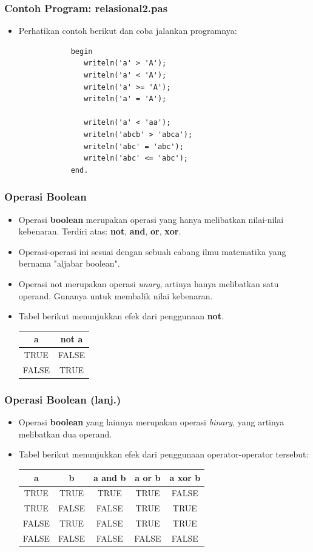\documentclass{beamer}
\begin{document}
\begin{frame}[fragile]
\frametitle{Contoh Program: relasional2.pas}
\begin{itemize}
    \item Perhatikan contoh berikut dan coba jalankan programnya:
        \begin{lstlisting}
            begin
               writeln('a' > 'A');
               writeln('a' < 'A');
               writeln('a' >= 'A');
               writeln('a' = 'A');

               writeln('a' < 'aa');
               writeln('abcb' > 'abca');
               writeln('abc' = 'abc');
               writeln('abc' <= 'abc');
            end.
        \end{lstlisting}
\end{itemize}
\end{frame}

\begin{frame}
\frametitle{Operasi Boolean}
\begin{itemize}
    \item Operasi \textbf{boolean} merupakan operasi yang hanya melibatkan nilai-nilai kebenaran. Terdiri atas: \textbf{not}, \textbf{and}, \textbf{or}, \textbf{xor}.
    \item Operasi-operasi ini sesuai dengan sebuah cabang ilmu matematika yang bernama "aljabar boolean".
    \item Operasi \alert{not} merupakan operasi \textit{unary}, artinya hanya melibatkan satu operand. Gunanya untuk membalik nilai kebenaran.
    \item Tabel berikut menunjukkan efek dari penggunaan \textbf{not}.
    \begin{tabular}{|c|c|}
    \hline a & not a \\
    \hline TRUE & FALSE \\
    \hline FALSE & TRUE \\
    \hline
    \end{tabular}
\end{itemize}
\end{frame}

\begin{frame}
\frametitle{Operasi Boolean (lanj.)}
\begin{itemize}
    \item Operasi \textbf{boolean} yang lainnya merupakan operasi \textit{binary}, yang artinya melibatkan dua operand.
    \item Tabel berikut menunjukkan efek dari penggunaan operator-operator tersebut:
    \begin{tabular}{|c|c|c|c|c|}
    \hline a & b & a and b & a or b & a xor b \\
    \hline TRUE & TRUE & TRUE & TRUE & FALSE \\
    \hline TRUE & FALSE & FALSE & TRUE & TRUE \\
    \hline FALSE & TRUE & FALSE & TRUE & TRUE\\
    \hline FALSE & FALSE & FALSE & FALSE & FALSE \\
    \hline
    \end{tabular}
\end{itemize}
\end{frame}
\end{document}
